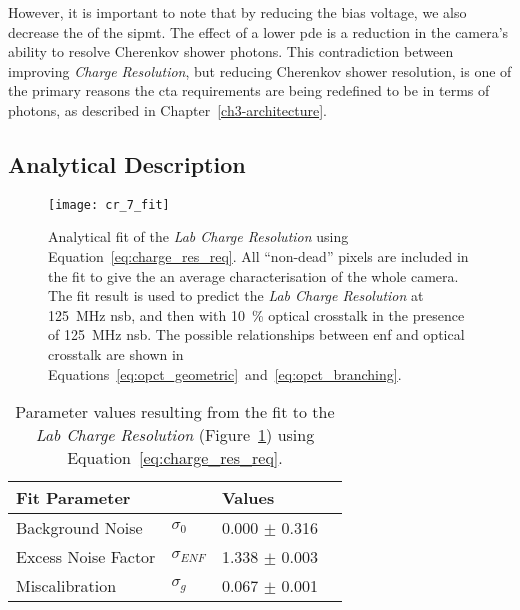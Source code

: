 However, it is important to note that by reducing the bias voltage, we also decrease the  of the \gls{sipmt}. The effect of a lower \gls{pde} is a reduction in the camera's ability to resolve Cherenkov shower photons. This contradiction between improving \textit{Charge Resolution}, but reducing Cherenkov shower resolution, is one of the primary reasons the \gls{cta} requirements are being redefined to be in terms of photons, as described in Chapter~\ref{ch3-architecture}.

\subsection{Analytical Description}

\begin{figure}[H]
	\centering
    \texttt{[image: cr\_7\_fit]} 
	\caption[Analytical fit of the \textit{Lab Charge Resolution}.]{Analytical fit of the \textit{Lab Charge Resolution} using Equation~\ref{eq:charge_res_req}. All ``non-dead'' pixels are included in the fit to give the an average characterisation of the whole camera. The fit result is used to predict the \textit{Lab Charge Resolution} at \SI{125}{MHz} \gls{nsb}, and then with \SI{10}{\percent} optical crosstalk in the presence of \SI{125}{MHz} \gls{nsb}. The possible relationships between \gls{enf} and optical crosstalk are shown in Equations~\ref{eq:opct_geometric}~and~\ref{eq:opct_branching}.}
	\label{fig:cr_7_fit}
\end{figure}

\begin{table}[h!]
\centering
\begin{tabular}{ll|ll} \toprule
    Fit Parameter        &                & Values             \\ \midrule
    Background Noise     & $\sigma_0$     & 0.000 $\pm$ 0.316  \\
    Excess Noise Factor  & $\sigma_{ENF}$ & 1.338 $\pm$ 0.003  \\
    Miscalibration       & $\sigma_g$     & 0.067 $\pm$ 0.001  \\ \bottomrule
\end{tabular}
\caption{Parameter values resulting from the fit to the \textit{Lab Charge Resolution} (Figure~\ref{fig:cr_7_fit}) using Equation~\ref{eq:charge_res_req}.}
\label{table:cr_7_fit}
\end{table}

